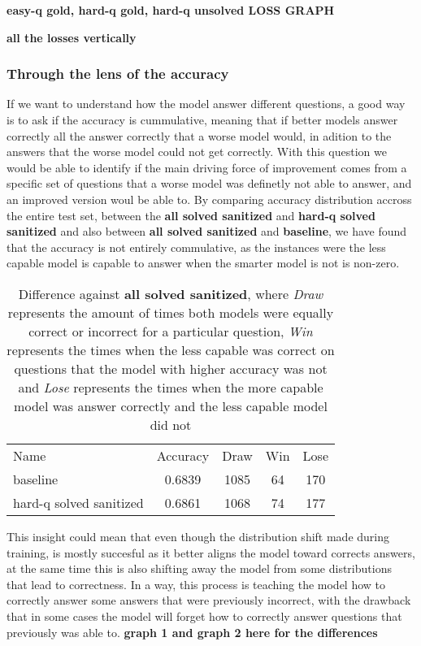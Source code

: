\documentclass[a4paper,10pt]{article}
\begin{document}
\textbf{easy-q gold, hard-q gold, hard-q unsolved LOSS GRAPH}

\textbf{all the losses vertically}

\subsubsection{Through the lens of the accuracy}
If we want to understand how the model answer different questions, a good way is to ask if the accuracy is cummulative, meaning that if better models answer correctly all the answer correctly that a worse model would, in adition to the answers that the worse model could not get correctly. With this question we would be able to identify if the main driving force of improvement comes from a specific set of questions that a worse model was definetly not able to answer, and an improved version woul be able to. By comparing accuracy distribution accross the entire test set, between the \textbf{all solved sanitized} and \textbf{hard-q solved sanitized} and also between \textbf{all solved sanitized} and \textbf{baseline}, we have found that the accuracy is not entirely commulative, as the instances were the less capable model is capable to answer when the smarter model is not is non-zero. 
\begin{table}[ht]
\centering
 \begin{tabular}{lcccc}
 Name & Accuracy & Draw & Win & Lose\\
 baseline & 0.6839 & 1085 & 64 & 170 \\
 hard-q solved sanitized & 0.6861 & 1068 & 74 & 177\\
 \end{tabular}
 \caption{Difference against \textbf{all solved sanitized}, where \textit{Draw} represents the amount of times both models were equally correct or incorrect for a particular question, \textit{Win} represents the times when the less capable was correct on questions that the model with higher accuracy was not and \textit{Lose} represents the times when the more capable model was answer correctly and the less capable model did not}
\end{table}

This insight could mean that even though the distribution shift made during training, is mostly succesful as it better aligns the model toward corrects answers, at the same time this is also shifting away the model from some distributions that lead to correctness. In a way, this process is teaching the model how to correctly answer some answers that were previously incorrect, with the drawback that in some cases the model will forget how to correctly answer questions that previously was able to. 
\textbf{graph 1 and graph 2 here for the differences}
\end{document}
